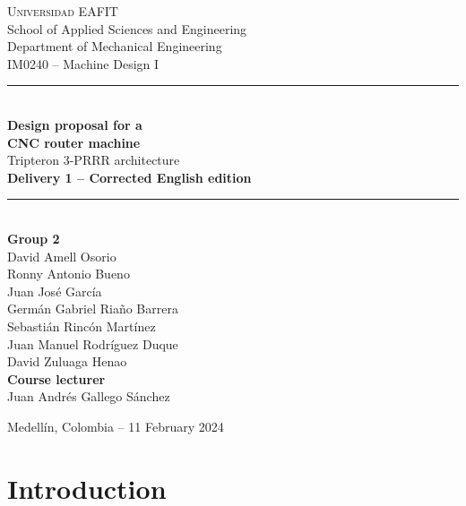 \documentclass[11pt]{article}
\begin{document}
\thispagestyle{empty}
\begin{center}
\vspace*{1cm}
{\Large\scshape Universidad EAFIT}\\[3pt]
{\large School of Applied Sciences and Engineering}\\[3pt]
{\large Department of Mechanical Engineering}\\[3pt]
{\large IM0240 -- Machine Design I}\\[1.8cm]

{\color{eafitblue}\rule{\textwidth}{1.4pt}}\\[12pt]
{\huge\bfseries Design proposal for a}\\[6pt]
{\huge\bfseries CNC router machine}\\[10pt]
{\LARGE Tripteron 3-PRRR architecture}\\[10pt]
{\large\bfseries Delivery 1 -- Corrected English edition}\\[8pt]
{\color{eafitblue}\rule{\textwidth}{1.4pt}}\\[2cm]

{\large\bfseries Group 2}\\[8pt]
{\large David Amell Osorio}\\[4pt]
{\large Ronny Antonio Bueno}\\[4pt]
{\large Juan Jos\'e Garc\'ia}\\[4pt]
{\large Germ\'an Gabriel Ria\~no Barrera}\\[4pt]
{\large Sebasti\'an Rinc\'on Mart\'inez}\\[4pt]
{\large Juan Manuel Rodr\'iguez Duque}\\[4pt]
{\large David Zuluaga Henao}\\[1.4cm]

{\large\bfseries Course lecturer}\\[8pt]
{\large Juan Andr\'es Gallego S\'anchez}

\vfill
{\large Medell\'in, Colombia -- 11 February 2024}
\end{center}

\clearpage
\tableofcontents
\clearpage

\section{Introduction}
\end{document}

